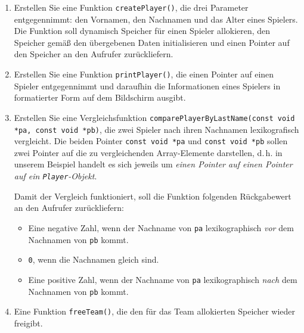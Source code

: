 \begin{enumerate}
  \item Erstellen Sie eine Funktion \texttt{createPlayer()}, die drei
  Parameter entgegennimmt: den Vornamen, den Nachnamen und das Alter eines
  Spielers. Die Funktion soll dynamisch Speicher für einen Spieler allokieren,
  den Speicher gemäß den übergebenen Daten initialisieren und einen Pointer auf
  den Speicher an den Aufrufer zurückliefern.
  \item Erstellen Sie eine Funktion \texttt{printPlayer()}, die einen
  Pointer auf einen Spieler entgegennimmt und daraufhin die Informationen eines
  Spielers in formatierter Form auf dem Bildschirm ausgibt.
  \item Erstellen Sie eine Vergleichsfunktion
  \texttt{comparePlayerByLastName(const void *pa, const void *pb)}, die
  zwei Spieler nach ihren Nachnamen lexikografisch vergleicht. Die beiden
  Pointer \texttt{const void *pa} und \texttt{const void *pb}
  sollen zwei Pointer auf die zu vergleichenden Array-Elemente darstellen,
  d.\,h. in unserem Beispiel handelt es sich jeweils um \textit{einen Pointer
  auf einen Pointer auf ein \texttt{Player}-Objekt}.

  Damit der Vergleich funktioniert, soll die Funktion folgenden Rückgabewert an
  den Aufrufer zurückliefern:
  \begin{itemize}
    \item Eine negative Zahl, wenn der Nachname von \texttt{pa}
    lexikographisch \textit{vor} dem Nachnamen von \texttt{pb} kommt.
    \item \texttt{0}, wenn die Nachnamen gleich sind.
    \item Eine positive Zahl, wenn der Nachname von \texttt{pa}
    lexikographisch \textit{nach} dem Nachnamen von \texttt{pb} kommt.
  \end{itemize}
  \item Eine Funktion \texttt{freeTeam()}, die den für das Team
  allokierten Speicher wieder freigibt.
\end{enumerate}

